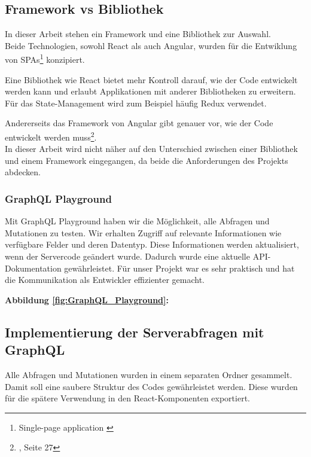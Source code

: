 \subsection{Framework vs Bibliothek}
\begin{flushleft}
  In dieser Arbeit stehen ein Framework und eine Bibliothek zur Auswahl.
  \\
  Beide Technologien, sowohl React als auch Angular, wurden für die Entwiklung von SPAs\footnote{Single-page application {\cite{MO1}}} konzipiert.

  Eine Bibliothek wie React bietet mehr Kontroll darauf, wie der Code entwickelt werden kann und erlaubt Applikationen mit anderer Bibliotheken zu erweitern. Für das State-Management wird zum Beispiel häufig Redux{\cite{RE1}} verwendet.

  Andererseits das Framework von Angular gibt genauer vor, wie der Code entwickelt werden muss\footnote{{\cite{AN1}}, Seite 27}.
  \\
  In dieser Arbeit wird nicht näher auf den Unterschied zwischen einer Bibliothek und einem Framework eingegangen, da beide die Anforderungen des Projekts abdecken.
\end{flushleft}

\subsubsection{GraphQL Playground}
Mit GraphQL Playground haben wir die Möglichkeit, alle Abfragen und Mutationen zu testen. Wir erhalten Zugriff auf relevante Informationen wie verfügbare Felder und deren Datentyp. Diese Informationen werden aktualisiert, wenn der Servercode geändert wurde. Dadurch wurde eine aktuelle API-Dokumentation gewährleistet. Für unser Projekt war es sehr praktisch und hat die Kommunikation als Entwickler effizienter gemacht.
\\
\begin{center}
\end{center}
\textbf{Abbildung \autoref{fig:GraphQL_Playground}:}
\newpage

\subsection{Implementierung der Serverabfragen mit GraphQL}
Alle Abfragen und Mutationen wurden in einem separaten Ordner gesammelt.
Damit soll eine saubere Struktur des Codes gewährleistet werden.
Diese wurden für die spätere Verwendung in den React-Komponenten exportiert.

